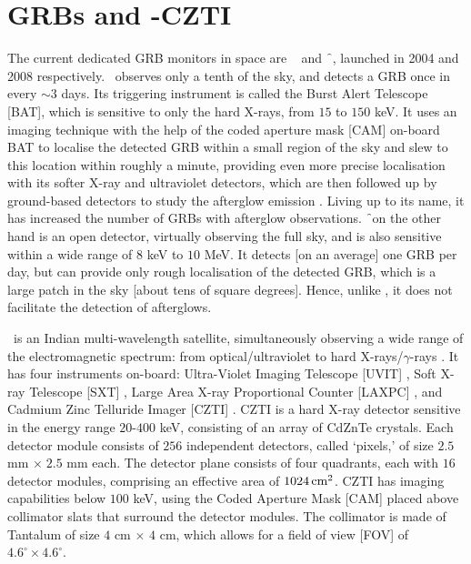 \section{GRBs and \AS-CZTI}
\label{sec:GRBs_and_AstroSat}
The current dedicated GRB monitors in space are \s\ \citep{Gehrels_et_al.-2004-ApJ} and \f\ \citep{FermiGBM-2009-ApJ}, launched in 2004 and 2008 respectively. \s\ observes only a tenth of the sky, and detects a GRB once in every $\sim 3$ days. Its triggering instrument is called the Burst Alert Telescope [BAT], which is sensitive to only the hard X-rays, from $15$ to $150$ keV. It uses an imaging technique with the help of the coded aperture mask [CAM] on-board BAT \citep{Band-2006-ApJ} to localise the detected GRB within a small region of the sky and slew to this location within roughly a minute, providing even more precise localisation with its softer X-ray and ultraviolet detectors, which are then followed up by ground-based detectors to study the afterglow emission \citep{Barthelmy_et_al.-2005-SSRv-SwiftBAT}. Living up to its name, it has increased the number of GRBs with afterglow observations. \f\ on the other hand is an open detector, virtually observing the full sky, and is also sensitive within a wide range of $8$ keV to $10$ MeV. It detects [on an average] one GRB per day, but can provide only rough localisation of the detected GRB, which is a large patch in the sky [about tens of square degrees]. Hence, unlike \s, it does not facilitate the detection of afterglows.

\AS\ is an Indian multi-wavelength satellite, simultaneously observing a wide range of the electromagnetic spectrum: from optical/ultraviolet to hard X-rays/$\gamma$-rays \citep{Rao_et_al.-2016-arXiv-Astrosat}. It has four instruments on-board: Ultra-Violet Imaging Telescope [UVIT] \citep{Subramaniam_et_al.-2016-SPIE, Tandon_et_al.-2017-AJ, Tandon_et_al.-2017-JApA, Rahna_et_al.-2017-MNRAS}, Soft X-ray Telescope [SXT] \citep{Singh_et_al.-2016-SPIE, Singh_et_al.-2017-JApA}, Large Area X-ray Proportional Counter [LAXPC] \citep{Agrawal_et_al.-2017-JApA, Antia_et_al.-2017-ApJS, Yadav_et_al.-2017-arXiv}, and Cadmium Zinc Telluride Imager [CZTI] \citep{Bhalerao_et_al.-2017-JApA}. CZTI is a hard X-ray detector sensitive in the energy range $20$-$400$ keV, consisting of an array of CdZnTe crystals. Each detector module consists of $256$ independent detectors, called `pixels,' of size $2.5$ mm $\times \; 2.5$ mm each. The detector plane consists of four quadrants, each with $16$ detector modules, comprising an effective area of $1024 \, \rm{cm{^2}}$. CZTI has imaging capabilities below $100$ keV, using the Coded Aperture Mask [CAM] placed above collimator slats that surround the detector modules. The collimator is made of Tantalum of size $4$ cm $\times$ $4$ cm, which allows for a field of view [FOV] of $4.6^{\circ} \times 4.6^{\circ}$.


